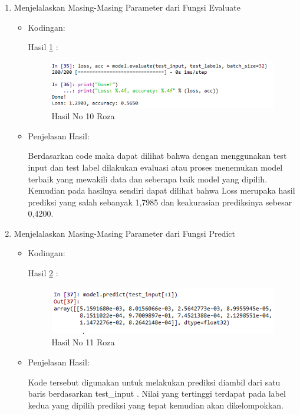 \begin{enumerate}
\item Menjelalaskan Masing-Masing  Parameter dari Fungsi Evaluate
\begin{itemize}
\item Kodingan:

\par Hasil \ref{no10roza} :
\begin{figure}[!hbtp]
\centering
\includegraphics[scale=0.7]{figures/no10roza.png}
\caption{Hasil No 10 Roza}
\label{no10roza}
\end{figure}
\item Penjelasan Hasil:
\par Berdasarkan code maka dapat dilihat bahwa dengan menggunakan test input dan test label dilakukan evaluasi atau proses menemukan model terbaik yang mewakili data dan seberapa baik model yang dipilih. Kemudian pada hasilnya sendiri dapat dilihat bahwa Loss merupaka hasil prediksi yang salah sebanyak 1,7985 dan keakurasian prediksinya sebesar 0,4200.
\end{itemize}
\par

\item Menjelalaskan Masing-Masing  Parameter dari Fungsi Predict
\begin{itemize}
\item Kodingan:

\par Hasil \ref{no11roza} :
\begin{figure}[!hbtp]
\centering
\includegraphics[scale=0.7]{figures/no11roza.png}
\caption{Hasil No 11 Roza}
\label{no11roza}
\end{figure}
\item Penjelasan Hasil:
\par Kode tersebut digunakan untuk melakukan prediksi diambil dari satu baris berdasarkan test\_input . Nilai yang tertinggi terdapat pada label kedua yang dipilih prediksi yang tepat kemudian akan dikelompokkan.
\end{itemize}
\par


\end{enumerate}
